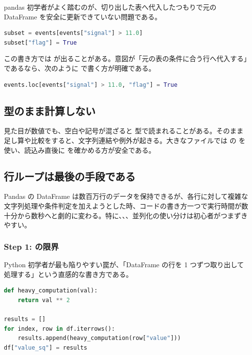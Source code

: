 pandas 初学者がよく踏むのが、切り出した表へ代入したつもりで元の DataFrame を安全に更新できていない問題である。

\begin{lstlisting}[language=Python]
subset = events[events["signal"] > 11.0]
subset["flag"] = True
\end{lstlisting}

この書き方では  が出ることがある。意図が「元の表の条件に合う行へ代入する」であるなら、次のように  で書く方が明確である。

\begin{lstlisting}[language=Python]
events.loc[events["signal"] > 11.0, "flag"] = True
\end{lstlisting}

\subsection{ 型のまま計算しない}

見た目が数値でも、空白や記号が混ざると  型で読まれることがある。そのまま足し算や比較をすると、文字列連結や例外が起きる。大きなファイルでは  の  を使い、読込み直後に  を確かめる方が安全である。

\subsection{行ループは最後の手段である}

Pandas の DataFrame は数百万行のデータを保持できるが、各行に対して複雑な文字列処理や条件判定を加えようとした時、コードの書き方一つで実行時間が数十分から数秒へと劇的に変わる。特に、、、並列化の使い分けは初心者がつまずきやすい。

\subsubsection{Step 1:  の限界}

Python 初学者が最も陥りやすい罠が、「DataFrame の行を 1 つずつ取り出して処理する」という直感的な書き方である。

\begin{lstlisting}[language=Python]
def heavy_computation(val):
    return val ** 2

results = []
for index, row in df.iterrows():
    results.append(heavy_computation(row["value"]))
df["value_sq"] = results
\end{lstlisting}

